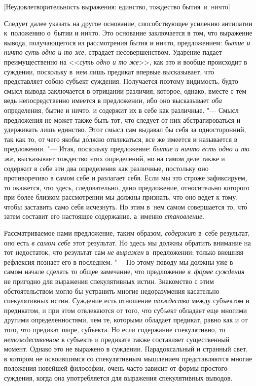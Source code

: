 %
{[Неудовлетворительность выражения: единство, тождество бытия~и~ничто]}

Следует далее указать на другое основание, способствующее усилению антипатии
к~положению о~бытии и ничто. Это основание заключается в том, что выражение
вывода, получающегося из рассмотрения бытия и ничто, предложением:
{\em бытие и ничто суть одно и то же,} страдает несовершенством. Ударение
падает преимущественно на <<{\em суть одно и то же}>>, как это и вообще
происходит в суждении, поскольку в~нем лишь предикат впервые высказывает,
чт\'{о} представляет собою субъект суждения. Получается поэтому видимость,
будто смысл вывода заключается в отрицании различия, которое, однако, вместе с
тем ведь непосредственно имеется в предложении, ибо оно высказывает {\em оба}
определения, бытие и ничто, и содержит их в себе как различные. "--- Смысл
предложения не может также быть тот, что следует от них абстрагироваться и
удерживать лишь единство. Этот смысл сам выдавал бы себя за односторонний, так
как то, от чего якобы д\'{о}лжно отвлекаться, все же имеется и называется в
предложении. "--- Итак, поскольку предложение: {\em бытие и ничто есть одно и
то же,} высказывает тождество этих определений, но на самом деле также и
содержит в себе эти два определения как различные, постольку оно противоречиво
в самом себе и разлагает себя. Если мы это строже зафиксируем, то окажется, что
здесь, следовательно, дано предложение, относительно которого при более близком
рассмотрении мы должны признать, что оно ведет к тому, чтобы заставить само
себя исчезнуть. Но этим в~нем самом совершается то, чт\'{о} затем составит его
настоящее содержание, а~именно {\em становление}.

Рассматриваемое нами предложение, таким образом, {\em содержит} в~себе
результат, оно есть {\em в самом себе} этот результат. Но здесь мы должны
обратить внимание на тот недостаток, что результат сам {\em не выражен}
в~предложении; только внешняя рефлексия познает его в последнем. "--- По этому
поводу мы должны уже в самом начале сделать то общее замечание, что предложение
{\em в~форме суждения} не пригодно для выражения спекулятивных истин.
Знакомство с этим обстоятельством могло бы устранить многие недоразумения
касательно спекулятивных истин. Суждение есть отношение {\em тождества} между
субъектом и предикатом, и при этом отвлекаются от того, что субъект обладает
еще многими другими определенностями, чем те, которыми обладает предикат, равно
как и от того, что предикат шире, субъекта. Но если содержание спекулятивно, то
{\em нетождественное} в субъекте и предикате также составляет существенный
момент. Однако это не выражено в суждении. Парадоксальный и странный свет, в
котором не освоившимся со спекулятивным мышлением представляются многие
положения новейшей философии, очень часто зависит от формы простого суждения,
когда она употребляется для выражения спекулятивных выводов.

